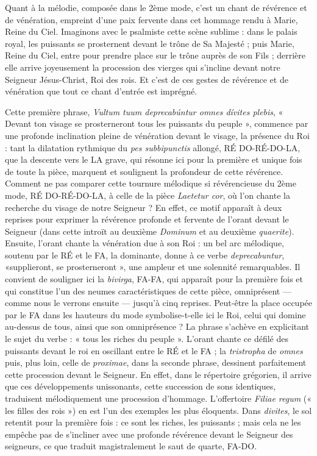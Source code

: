 \documentclass[Session2026.tex]{subfiles}
\begin{document}
Quant à la mélodie, composée dans le 2ème mode, c'est un chant de
révérence et de vénération, empreint d'une paix fervente dans cet
hommage rendu à Marie, Reine du Ciel. Imaginons avec le psalmiste cette
scène sublime : dans le palais royal, les puissants se prosternent
devant le trône de Sa Majesté ; puis Marie, Reine du Ciel, entre pour
prendre place sur le trône auprès de son Fils ; derrière elle arrive
joyeusement la procession des vierges qui s'incline devant notre
Seigneur Jésus-Christ, Roi des rois. Et c'est de ces gestes de révérence
et de vénération que tout ce chant d'entrée est imprégné.

Cette première phrase, \emph{Vultum tuum deprecabúntur omnes dívites
plebis}, « Devant ton visage se prosterneront tous les puissants du
peuple », commence par une profonde inclination pleine de vénération
devant le visage, la présence du Roi : tant la dilatation rythmique du
\emph{pes subbipunctis} allongé, RÉ DO-RÉ-DO-LA, que la descente vers le
LA grave, qui résonne ici pour la première et unique fois de toute la
pièce, marquent et soulignent la profondeur de cette révérence. Comment
ne pas comparer cette tournure mélodique si révérencieuse du 2ème mode,
RÉ DO-RÉ-DO-LA, à celle de la pièce \emph{Laetetur cor}, où l'on chante
la recherche du visage de notre Seigneur ? En effet, ce motif apparaît à
deux reprises pour exprimer la révérence profonde et fervente de l'orant
devant le Seigneur (dans cette introït au deuxième \emph{Dominum} et au
deuxième \emph{quaerite}). Ensuite, l'orant chante la vénération due à
son Roi : un bel arc mélodique, soutenu par le RÉ et le FA, la
dominante, donne à ce verbe \emph{deprecabuntur}, «supplieront, se
prosterneront », une ampleur et une solennité remarquables. Il convient
de souligner ici la \emph{bivirga}, FA-FA, qui apparaît pour la première
fois et qui constitue l'un des neumes caractéristiques de cette pièce,
omniprésent --- comme nous le verrons ensuite --- jusqu'à cinq reprises.
Peut-être la place occupée par le FA dans les hauteurs du mode
symbolise-t-elle ici le Roi, celui qui domine au-dessus de tous, ainsi
que son omniprésence ? La phrase s'achève en explicitant le sujet du
verbe : « tous les riches du peuple ». L'orant chante ce défilé des
puissants devant le roi en oscillant entre le RÉ et le FA ; la
\emph{tristropha} de \emph{omnes} puis, plus loin, celle de
\emph{proximae}, dans la seconde phrase, dessinent parfaitement cette
procession devant le Seigneur. En effet, dans le répertoire grégorien,
il arrive que ces développements unissonants, cette succession de sons
identiques, traduisent mélodiquement une procession d'hommage.
L'offertoire \emph{Filiae regum} (« les filles des rois ») en est l'un
des exemples les plus éloquents. Dans \emph{divites}, le sol retentit
pour la première fois : ce sont les riches, les puissants ; mais cela ne
les empêche pas de s'incliner avec une profonde révérence devant le
Seigneur des seigneurs, ce que traduit magistralement le saut de quarte,
FA-DO.
\end{document}
